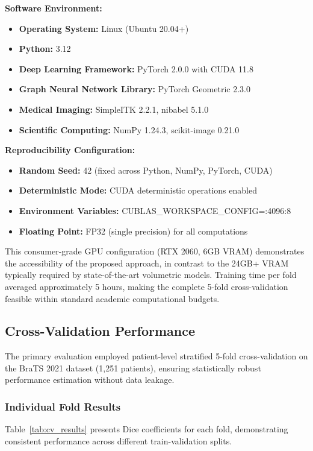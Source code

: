 \textbf{Software Environment:}
\begin{itemize}
    \item \textbf{Operating System:} Linux (Ubuntu 20.04+)
    \item \textbf{Python:} 3.12
    \item \textbf{Deep Learning Framework:} PyTorch 2.0.0 with CUDA 11.8
    \item \textbf{Graph Neural Network Library:} PyTorch Geometric 2.3.0
    \item \textbf{Medical Imaging:} SimpleITK 2.2.1, nibabel 5.1.0
    \item \textbf{Scientific Computing:} NumPy 1.24.3, scikit-image 0.21.0
\end{itemize}

\textbf{Reproducibility Configuration:}
\begin{itemize}
    \item \textbf{Random Seed:} 42 (fixed across Python, NumPy, PyTorch, CUDA)
    \item \textbf{Deterministic Mode:} CUDA deterministic operations enabled
    \item \textbf{Environment Variables:} CUBLAS\_WORKSPACE\_CONFIG=:4096:8
    \item \textbf{Floating Point:} FP32 (single precision) for all computations
\end{itemize}

This consumer-grade GPU configuration (RTX 2060, 6GB VRAM) demonstrates the accessibility of the proposed approach, in contrast to the 24GB+ VRAM typically required by state-of-the-art volumetric models. Training time per fold averaged approximately 5 hours, making the complete 5-fold cross-validation feasible within standard academic computational budgets.


\subsection{Cross-Validation Performance}

The primary evaluation employed patient-level stratified 5-fold cross-validation on the BraTS 2021 dataset (1,251 patients), ensuring statistically robust performance estimation without data leakage.

\subsubsection{Individual Fold Results}

Table~\ref{tab:cv_results} presents Dice coefficients for each fold, demonstrating consistent performance across different train-validation splits.

